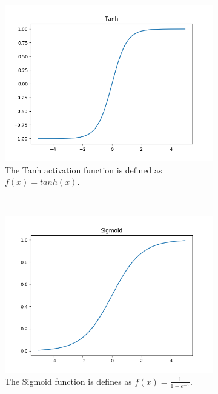 \begin{figure}[h!]
\centering
	\begin{subfigure}[t]{0.5\textwidth}
		\centering
		\includegraphics[width=\textwidth]{img/methodology_neuralNetwork_activationFunction_tanh.png}
		\caption{The Tanh activation function is defined as $f(x) = tanh(x)$.}
	\end{subfigure}%
	~ 
	\begin{subfigure}[t]{0.5\textwidth}
		\centering
		\includegraphics[width=\textwidth]{img/methodology_neuralNetwork_activationFunction_sigmoid.png}
		\caption{The Sigmoid function is defines as $f(x) = \frac{1}{1 + e^{-x}}$.}
	\end{subfigure}
	~
	\begin{subfigure}[t]{0.5\textwidth}

\end{subfigure}
\end{figure}
